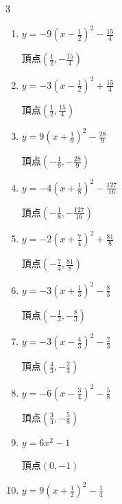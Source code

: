 \newpage
\resetdrill

\begin{multicols}{3}
\begin{enumerate}
  \itemsep=5pt
  \item $\displaystyle y=-9\left( x-\frac{1}{2}\right)^{2}-\frac{15}{4}$

        $\displaystyle 頂点\left( \frac{1}{2} , -\frac{15}{4} \right)$

  \item $\displaystyle y=-3\left( x-\frac{1}{2}\right)^{2}+\frac{15}{4}$

        $\displaystyle 頂点\left( \frac{1}{2} , \frac{15}{4} \right)$

  \item $\displaystyle y=9\left( x+\frac{1}{9}\right)^{2}-\frac{28}{9}$

        $\displaystyle 頂点\left( -\frac{1}{9} , -\frac{28}{9} \right)$

  \item $\displaystyle y=-4\left( x+\frac{1}{8}\right)^{2}-\frac{127}{16}$

        $\displaystyle 頂点\left( -\frac{1}{8} , -\frac{127}{16} \right)$

  \item $\displaystyle y=-2\left( x+\frac{7}{4}\right)^{2}+\frac{81}{8}$

        $\displaystyle 頂点\left( -\frac{7}{4} , \frac{81}{8} \right)$

  \item $\displaystyle y=-3\left( x+\frac{1}{3}\right)^{2}-\frac{8}{3}$

        $\displaystyle 頂点\left( -\frac{1}{3} , -\frac{8}{3} \right)$

  \item $\displaystyle y=-3\left( x-\frac{4}{3}\right)^{2}-\frac{2}{3}$

        $\displaystyle 頂点\left( \frac{4}{3} , -\frac{2}{3} \right)$

  \item $\displaystyle y=-6\left( x-\frac{3}{4}\right)^{2}-\frac{5}{8}$

        $\displaystyle 頂点\left( \frac{3}{4} , -\frac{5}{8} \right)$

  \item $\displaystyle y=6x^{2}-1$

        $\displaystyle 頂点\left( 0 , -1 \right)$

  \item $\displaystyle y=9\left( x+\frac{1}{2}\right)^{2}-\frac{1}{4}$


\end{enumerate}
\end{multicols}
